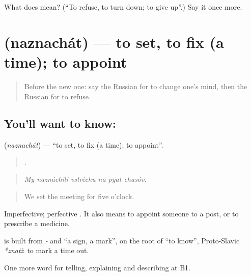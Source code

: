 \begin{tcolorbox}[breakable,colback=teal!4,colframe=teal!35!black,title={Before you move on}]
What does  mean? (\textquotedblleft{}To refuse, to turn down; to give up\textquotedblright{}.) Say it once more.
\end{tcolorbox}
\section[\texorpdfstring{\ru{назначать} (naznachát)}{назначать (naznachát)}]{ (naznachát) — to set, to fix (a time); to appoint}

\label{lesson:RU-C377-naznachat}



\begin{quote}
Before the new one: say the Russian for to change one’s mind, then the Russian for to refuse.
\end{quote}

\subsection*{You'll want to know: }
\textbf{} (\emph{naznachát}) — \textquotedblleft{}to set, to fix (a time); to appoint\textquotedblright{}.

\begin{quote}
     .
\end{quote}

\begin{quote}
\emph{My naznáchili vstréchu na pyat chasóv.}
\end{quote}

\begin{quote}
We set the meeting for five o’clock.
\end{quote}

Imperfective; perfective \emph{}. It also means to appoint someone to a post, or to prescribe a medicine.

\begin{cousinweb}
\textbf{} is built from \emph{-} and \emph{} \textquotedblleft{}a sign, a mark\textquotedblright{}, on the root of \emph{} \textquotedblleft{}to know\textquotedblright{}, Proto-Slavic \emph{*znati}: to mark a time out.
\end{cousinweb}

\begin{grammarlens}[title={What you've built}]
One more word for telling, explaining and describing at B1.
\end{grammarlens}

